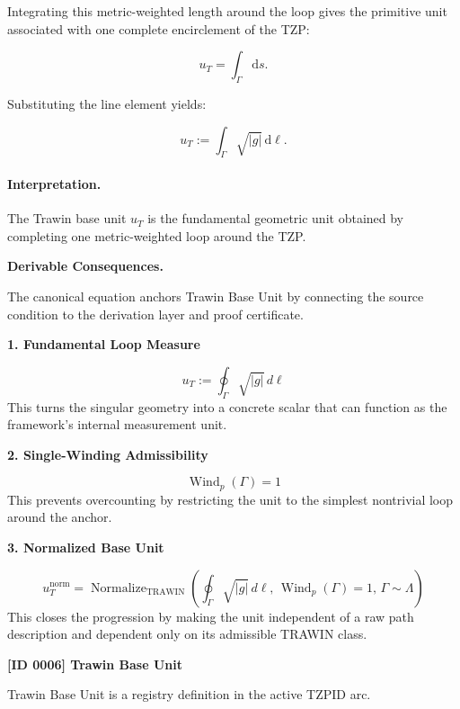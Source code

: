 Integrating this metric-weighted length around the loop gives the primitive unit associated with one complete encirclement of the TZP:

\begin{equation}
u_T = \int_{\Gamma}\mathrm{d}s .
\end{equation}

Substituting the line element yields:

\begin{equation}
\boxed{
u_T := \int_{\Gamma}\sqrt{|g|}\,\mathrm{d}\ell .
}
\end{equation}

\paragraph{Interpretation.}
The Trawin base unit $u_T$ is the fundamental geometric unit obtained by completing one metric-weighted loop around the TZP.

\par\vspace{0.35em}
\noindent\textbf{Derivable Consequences.}\quad
\begingroup
\footnotesize
\raggedright
The canonical equation anchors Trawin Base Unit by connecting the source condition to the derivation layer and proof certificate.
\par\endgroup

\noindent\textbf{1. Fundamental Loop Measure}\par
\[
u_{T}
:=
\oint_{\Gamma}
\sqrt{\lvert g \rvert}\, d\ell
\]
\noindent This turns the singular geometry into a concrete scalar that can function as the framework's internal measurement unit.\par
\noindent\textbf{2. Single-Winding Admissibility}\par
\[
\operatorname{Wind}_{p}(\Gamma)=1
\]
\noindent This prevents overcounting by restricting the unit to the simplest nontrivial loop around the anchor.\par
\noindent\textbf{3. Normalized Base Unit}\par
\[
u_{T}^{\mathrm{norm}}
=
\operatorname{Normalize}_{\mathrm{TRAWIN}}
\!\left(
\oint_{\Gamma}\sqrt{\lvert g \rvert}\, d\ell,\,
\operatorname{Wind}_{p}(\Gamma)=1,\,
\Gamma \sim \Lambda
\right)
\]
\noindent This closes the progression by making the unit independent of a raw path description and dependent only on its admissible TRAWIN class.\par

\clearpage
\noindent\textbf{[ID 0006] Trawin Base Unit}\par
\vspace{0.35em}
\begingroup\small
{}
Trawin Base Unit is a registry definition in the active TZPID arc.

